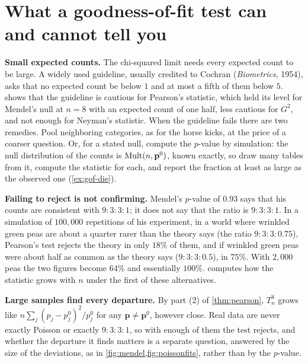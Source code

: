 \section{What a goodness-of-fit test can and cannot tell you}
\label{sec:gof-limits}

\textbf{Small expected counts.}
The chi-squared limit needs every expected count to be large.
A widely used guideline, usually credited to Cochran (\textit{Biometrics}, 1954), asks that no expected count be below $1$ and at most a fifth of them below $5$.
 shows that the guideline is cautious for Pearson's statistic, which held its level for Mendel's null at $n = 8$ with an expected count of one half, less cautious for $G^2$, and not enough for Neyman's statistic.
When the guideline fails there are two remedies.
Pool neighboring categories, as for the horse kicks, at the price of a coarser question.
Or, for a stated null, compute the $p$-value by simulation: the null distribution of the counts is $\mathrm{Mult}(n, \mathbf{p}^0)$, known exactly, so draw many tables from it, compute the statistic for each, and report the fraction at least as large as the observed one (\cref{ex:gof-die}).

\textbf{Failing to reject is not confirming.}
Mendel's $p$-value of $0.93$ says that his counts are consistent with $9:3:3:1$; it does not say that the ratio is $9:3:3:1$.
In a simulation of $100{,}000$ repetitions of his experiment, in a world where wrinkled green peas are about a quarter rarer than the theory says (the ratio $9:3:3:0.75$), Pearson's test rejects the theory in only $18\%$ of them, and if wrinkled green peas were about half as common as the theory says ($9:3:3:0.5$), in $75\%$.
With $2{,}000$ peas the two figures become $64\%$ and essentially $100\%$.
 computes how the statistic grows with $n$ under the first of these alternatives.

\textbf{Large samples find every departure.}
By part (2) of \cref{thm:pearson}, $T^{\mathrm{S}}_n$ grows like $n\sum_j(p_j - p^0_j)^2/p^0_j$ for any $\mathbf{p} \neq \mathbf{p}^0$, however close.
Real data are never exactly Poisson or exactly $9:3:3:1$, so with enough of them the test rejects, and whether the departure it finds matters is a separate question, answered by the size of the deviations, as in \cref{fig:mendel,fig:poissonfits}, rather than by the $p$-value.

